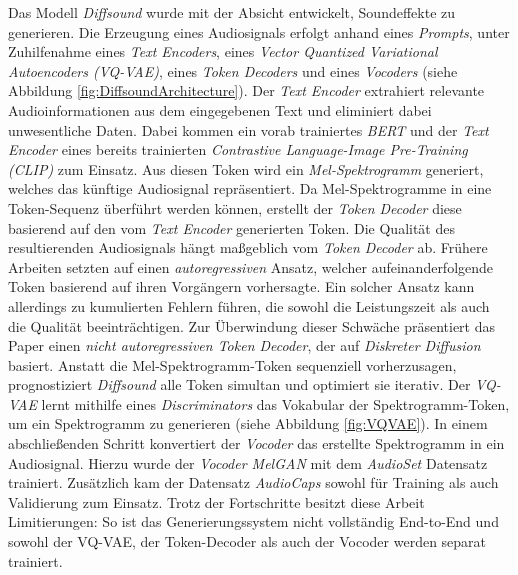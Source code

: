 \documentclass[
  a4paper,  %
  twoside,  %
  bibliography=totoc,
  headsepline,
  cleardoublepage=empty,
  parskip=half,
  draft=false
]{scrbook}
\begin{document}
Das Modell \emph{Diffsound} \cite{yang_diffsound_2023} wurde mit der Absicht entwickelt, Soundeffekte zu generieren. Die Erzeugung eines Audiosignals erfolgt anhand eines \emph{Prompts}, unter Zuhilfenahme eines \emph{Text Encoders}, eines \emph{Vector Quantized Variational Autoencoders (VQ-VAE)}, eines \emph{Token Decoders} und eines \emph{Vocoders} (siehe Abbildung \ref{fig:DiffsoundArchitecture}). Der \emph{Text Encoder} extrahiert relevante Audioinformationen aus dem eingegebenen Text und eliminiert dabei unwesentliche Daten. Dabei kommen ein vorab trainiertes \emph{BERT} \cite{devlin_bert_2019} und der \emph{Text Encoder} eines bereits trainierten \emph{Contrastive Language-Image Pre-Training (CLIP)} \cite{radford_learning_2021} zum Einsatz. Aus diesen Token wird ein \emph{Mel-Spektrogramm} generiert, welches das künftige Audiosignal repräsentiert. Da Mel-Spektrogramme in eine Token-Sequenz überführt werden können, erstellt der \emph{Token Decoder} diese basierend auf den vom \emph{Text Encoder} generierten Token. Die Qualität des resultierenden Audiosignals hängt maßgeblich vom \emph{Token Decoder} ab. Frühere Arbeiten \cite{liu_conditional_2021, iashin_taming_2021} setzten auf einen \emph{autoregressiven} Ansatz, welcher aufeinanderfolgende Token basierend auf ihren Vorgängern vorhersagte. Ein solcher Ansatz kann allerdings zu kumulierten Fehlern führen, die sowohl die Leistungszeit als auch die Qualität beeinträchtigen. Zur Überwindung dieser Schwäche präsentiert das Paper einen \emph{nicht autoregressiven Token Decoder}, der auf \emph{Diskreter Diffusion} \cite{sohl-dickstein_deep_2015, austin_structured_2023} basiert. Anstatt die Mel-Spektrogramm-Token sequenziell vorherzusagen, prognostiziert \emph{Diffsound} alle Token simultan und optimiert sie iterativ. Der \emph{VQ-VAE} \cite{oord_neural_2018} lernt mithilfe eines \emph{Discriminators} das Vokabular der Spektrogramm-Token, um ein Spektrogramm zu generieren (siehe Abbildung \ref{fig:VQVAE}). In einem abschließenden Schritt konvertiert der \emph{Vocoder} das erstellte Spektrogramm in ein Audiosignal. Hierzu wurde der \emph{Vocoder MelGAN} \cite{kumar_melgan_2019} mit dem \emph{AudioSet} \cite{gemmeke_audio_2017} Datensatz trainiert. Zusätzlich kam der Datensatz \emph{AudioCaps} \cite{kim_audiocaps_2019} sowohl für Training als auch Validierung zum Einsatz. Trotz der Fortschritte besitzt diese Arbeit Limitierungen: So ist das Generierungssystem nicht vollständig End-to-End und sowohl der VQ-VAE, der Token-Decoder als auch der Vocoder werden separat trainiert. \cite{yang_diffsound_2023}
\end{document}
